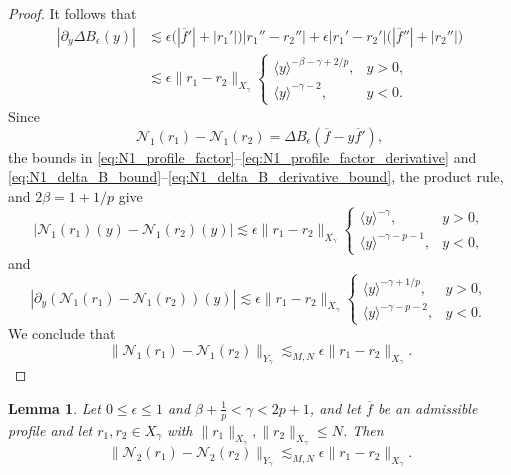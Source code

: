 \documentclass[11pt]{amsart}
\newtheorem{lemma}[theorem]{Lemma}
\theoremstyle{definition}
\theoremstyle{remark}
\numberwithin{equation}{section}
\newcommand{\mc}[1]{\mathcal{#1}}
\newcommand{\ov}[1]{\overline{#1}}
\newcommand{\ang}[1]{\langle #1 \rangle}
\begin{document}
\begin{proof}
    It follows that
    \begin{equation}\label{eq:N1_delta_B_derivative_bound}
\begin{aligned}
        |\partial_y\Delta B_\epsilon(y)|
        &\lesssim\epsilon\bigl(|\ov{f}'|+|r_1'|\bigr)|r_1''-r_2''|
        +\epsilon|r_1'-r_2'|\bigl(|\ov{f}''|+|r_2''|\bigr)\\
        &\lesssim\epsilon\|r_1-r_2\|_{X_\gamma}
        \begin{cases}
            \ang{y}^{-\beta-\gamma+2/p}, & y>0,\\
            \ang{y}^{-\gamma-2}, & y<0.
        \end{cases}
    \end{aligned}
\end{equation}
    Since
    \[
        \mc{N}_1(r_1)-\mc{N}_1(r_2)
        =\Delta B_\epsilon\left(\ov{f}-y\ov{f}'\right),
    \]
    the bounds in \eqref{eq:N1_profile_factor}--\eqref{eq:N1_profile_factor_derivative} and \eqref{eq:N1_delta_B_bound}--\eqref{eq:N1_delta_B_derivative_bound}, the product rule, and $2\beta=1+1/p$ give
    \[
        |\mc{N}_1(r_1)(y)-\mc{N}_1(r_2)(y)|
        \lesssim\epsilon\|r_1-r_2\|_{X_\gamma}
        \begin{cases}
            \ang{y}^{-\gamma}, & y>0,\\
            \ang{y}^{-\gamma-p-1}, & y<0,
        \end{cases}
    \]
    and
    \[
        |\partial_y(\mc{N}_1(r_1)-\mc{N}_1(r_2))(y)|
        \lesssim\epsilon\|r_1-r_2\|_{X_\gamma}
        \begin{cases}
            \ang{y}^{-\gamma+1/p}, & y>0,\\
            \ang{y}^{-\gamma-p-2}, & y<0.
        \end{cases}
    \]
    We conclude that
    \[
        \|\mc{N}_1(r_1)-\mc{N}_1(r_2)\|_{Y_\gamma}
        \lesssim_{M,N}\epsilon\|r_1-r_2\|_{X_\gamma}.
    \]
\end{proof}

\begin{lemma}\label{lem:N2}
Let $0\le\epsilon\le1$ and $\beta + \frac{1}{p} < \gamma < 2p + 1$, and let $\ov{f}$ be an admissible profile and let $r_1, r_2 \in X_\gamma$ with $\|r_1\|_{X_\gamma}, \|r_2\|_{X_\gamma} \leq N$. Then 
\[\|\mc{N}_2(r_1) - \mc{N}_2(r_2)\|_{Y_\gamma} \lesssim_{M,N} \epsilon \|r_1 - r_2\|_{X_\gamma}.\]
\end{lemma}
\end{document}
